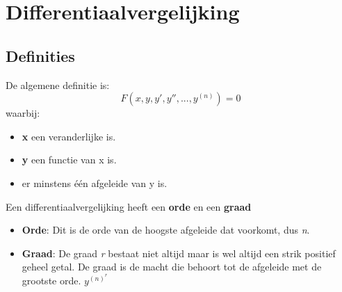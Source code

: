 \chapter{Differentiaalvergelijking}
\section{Definities}
De algemene definitie is:
$$F(x, y, y', y'', ..., y^{(n)}) = 0$$
waarbij: \begin{itemize}
\item \textbf{x} een veranderlijke is.
\item \textbf{y} een functie van x is.
\item er minstens één afgeleide van y is.
\end{itemize}

Een differentiaalvergelijking heeft een \textbf{orde} en een \textbf{graad}
\begin{itemize}
    \item \textbf{Orde}: Dit is de orde van de hoogste afgeleide dat voorkomt, dus \textit{n}.
    \item \textbf{Graad}: De graad \textit{r} bestaat niet altijd maar is wel altijd een strik positief geheel getal. De graad is de macht die behoort tot de afgeleide met de grootste orde. $y^{(n)^{r}}$
\end{itemize}

